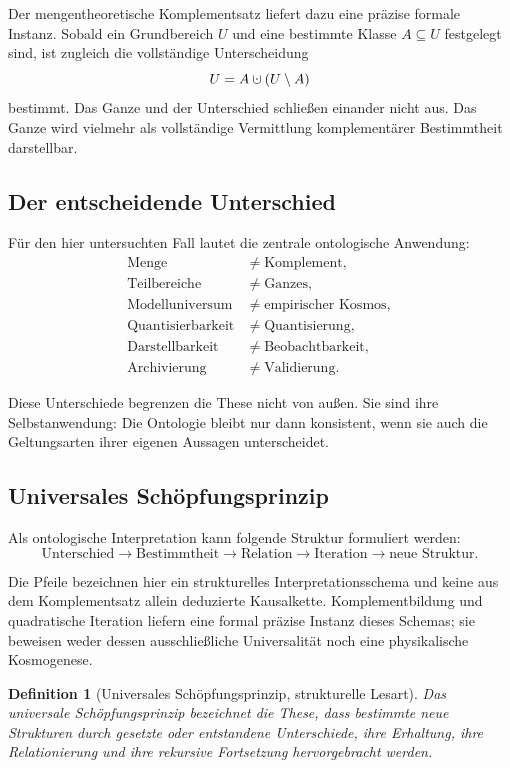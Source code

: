 \documentclass[11pt,a4paper]{article}
\newtheorem{definition}{Definition}[section]
\theoremstyle{remark}
\newcommand{\dotcup}{\mathbin{\mathaccent\cdot\cup}}
\begin{document}
Der mengentheoretische Komplementsatz liefert dazu eine präzise formale
Instanz. Sobald ein Grundbereich \(U\) und eine bestimmte Klasse
\(A\subseteq U\) festgelegt sind, ist zugleich die vollständige
Unterscheidung
\[
  U=A\dotcup(U\setminus A)
\]
bestimmt. Das Ganze und der Unterschied schließen einander nicht aus. Das
Ganze wird vielmehr als vollständige Vermittlung komplementärer Bestimmtheit
darstellbar.

\subsection{Der entscheidende Unterschied}

Für den hier untersuchten Fall lautet die zentrale ontologische Anwendung:
\[
\begin{aligned}
\text{Menge} &\neq \text{Komplement},\\
\text{Teilbereiche} &\neq \text{Ganzes},\\
\text{Modelluniversum} &\neq \text{empirischer Kosmos},\\
\text{Quantisierbarkeit} &\neq \text{Quantisierung},\\
\text{Darstellbarkeit} &\neq \text{Beobachtbarkeit},\\
\text{Archivierung} &\neq \text{Validierung}.
\end{aligned}
\]

Diese Unterschiede begrenzen die These nicht von außen. Sie sind ihre
Selbstanwendung: Die Ontologie bleibt nur dann konsistent, wenn sie auch die
Geltungsarten ihrer eigenen Aussagen unterscheidet.

\subsection{Universales Schöpfungsprinzip}

Als ontologische Interpretation kann folgende Struktur formuliert werden:
\[
  \text{Unterschied}
  \longrightarrow
  \text{Bestimmtheit}
  \longrightarrow
  \text{Relation}
  \longrightarrow
  \text{Iteration}
  \longrightarrow
  \text{neue Struktur}.
\]

Die Pfeile bezeichnen hier ein strukturelles Interpretationsschema und keine
aus dem Komplementsatz allein deduzierte Kausalkette. Komplementbildung und
quadratische Iteration liefern eine formal präzise Instanz dieses Schemas;
sie beweisen weder dessen ausschließliche Universalität noch eine physikalische
Kosmogenese.

\begin{definition}[Universales Schöpfungsprinzip, strukturelle Lesart]
Das \emph{universale Schöpfungsprinzip} bezeichnet die These, dass bestimmte
neue Strukturen durch gesetzte oder entstandene Unterschiede, ihre Erhaltung,
ihre Relationierung und ihre rekursive Fortsetzung hervorgebracht werden.
\end{definition}
\end{document}
